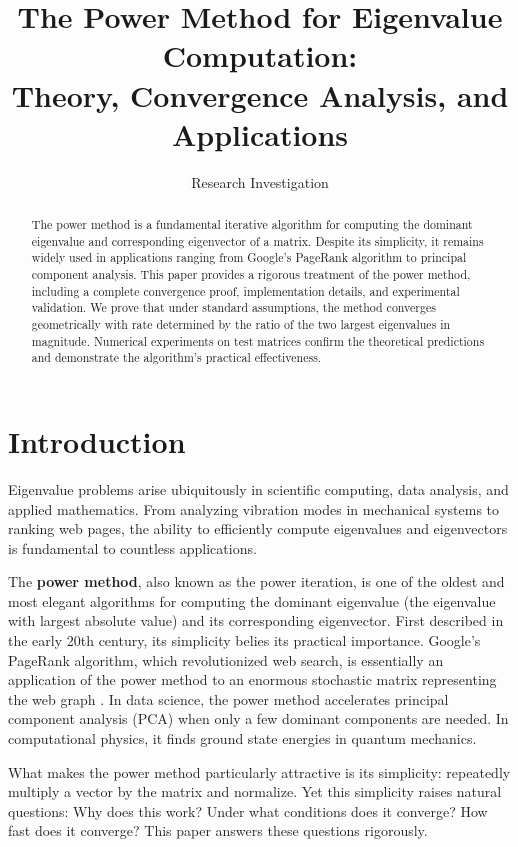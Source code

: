 \documentclass[11pt,a4paper]{article}
\title{\textbf{The Power Method for Eigenvalue Computation:\\
Theory, Convergence Analysis, and Applications}}
\author{Research Investigation}
\date{}
\begin{document}
\maketitle

\begin{abstract}
The power method is a fundamental iterative algorithm for computing the dominant eigenvalue and corresponding eigenvector of a matrix. Despite its simplicity, it remains widely used in applications ranging from Google's PageRank algorithm to principal component analysis. This paper provides a rigorous treatment of the power method, including a complete convergence proof, implementation details, and experimental validation. We prove that under standard assumptions, the method converges geometrically with rate determined by the ratio of the two largest eigenvalues in magnitude. Numerical experiments on test matrices confirm the theoretical predictions and demonstrate the algorithm's practical effectiveness.
\end{abstract}

\section{Introduction}

Eigenvalue problems arise ubiquitously in scientific computing, data analysis, and applied mathematics. From analyzing vibration modes in mechanical systems to ranking web pages, the ability to efficiently compute eigenvalues and eigenvectors is fundamental to countless applications.

The \textbf{power method}, also known as the power iteration, is one of the oldest and most elegant algorithms for computing the dominant eigenvalue (the eigenvalue with largest absolute value) and its corresponding eigenvector. First described in the early 20th century, its simplicity belies its practical importance. Google's PageRank algorithm, which revolutionized web search, is essentially an application of the power method to an enormous stochastic matrix representing the web graph \cite{pagerank}. In data science, the power method accelerates principal component analysis (PCA) when only a few dominant components are needed. In computational physics, it finds ground state energies in quantum mechanics.

What makes the power method particularly attractive is its simplicity: repeatedly multiply a vector by the matrix and normalize. Yet this simplicity raises natural questions: Why does this work? Under what conditions does it converge? How fast does it converge? This paper answers these questions rigorously.
\end{document}
